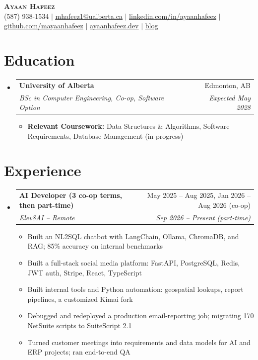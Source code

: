 \documentclass[letterpaper,10pt]{article}
\makeatletter
\newcommand{\resumeItem}[1]{
  \item\small{
    {#1 \vspace{-2pt}}
  }
}
\newcommand{\resumeSubheading}[4]{
  \vspace{-2pt}\item
    \begin{tabular*}{0.97\textwidth}[t]{l@{\extracolsep{\fill}}r}
      \textbf{#1} & #2 \\
      \textit{\small#3} & \textit{\small #4} \\
    \end{tabular*}\vspace{-7pt}
}
\newcommand{\resumeItemListStart}{\begin{itemize}[leftmargin=0.15in, label=\textbullet, itemsep=0pt, topsep=2pt]}
\newcommand{\resumeItemListEnd}{\end{itemize}\vspace{-5pt}}
\newcommand{\resumeSubHeadingListStart}{\begin{itemize}[leftmargin=0.15in, label={}]}
\newcommand{\resumeSubHeadingListEnd}{\end{itemize}}
\makeatother
\begin{document}
\begin{center}
    \textbf{\Huge \scshape Ayaan Hafeez} \\ \vspace{1pt}
    \small (587) 938-1534 $|$ \href{mailto:mhafeez1@ualberta.ca}{\underline{mhafeez1@ualberta.ca}} $|$
    \href{https://linkedin.com/in/ayaanhafeez}{\underline{linkedin.com/in/ayaanhafeez}} $|$
    \href{https://github.com/mayaanhafeez}{\underline{github.com/mayaanhafeez}} $|$
    \href{https://ayaanhafeez.dev}{\underline{ayaanhafeez.dev}} $|$
    \href{https://the-rubber-duck-blog.vercel.app/}{\underline{blog}}
\end{center}

\section{Education}
  \resumeSubHeadingListStart
    \resumeSubheading
      {University of Alberta}{Edmonton, AB}
      {BSc in Computer Engineering, Co-op, Software Option}{Expected May 2028}
      \resumeItemListStart
        \resumeItem{\textbf{Relevant Coursework:} Data Structures \& Algorithms, Software Requirements, Database Management (in progress)}
      \resumeItemListEnd
  \resumeSubHeadingListEnd

\section{Experience}
  \resumeSubHeadingListStart
    \resumeSubheading
      {AI Developer (3 co-op terms, then part-time)}{May 2025 -- Aug 2025, Jan 2026 -- Aug 2026 (co-op)}
      {Elev8AI -- Remote}{Sep 2026 -- Present (part-time)}
      \resumeItemListStart
        \resumeItem{Built an NL2SQL chatbot with LangChain, Ollama, ChromaDB, and RAG; 85\% accuracy on internal benchmarks}
        \resumeItem{Built a full-stack social media platform: FastAPI, PostgreSQL, Redis, JWT auth, Stripe, React, TypeScript}
        \resumeItem{Built internal tools and Python automation: geospatial lookups, report pipelines, a customized Kimai fork}
        \resumeItem{Debugged and redeployed a production email-reporting job; migrating 170 NetSuite scripts to SuiteScript 2.1}
        \resumeItem{Turned customer meetings into requirements and data models for AI and ERP projects; ran end-to-end QA}
      \resumeItemListEnd
  \resumeSubHeadingListEnd

\end{document}
